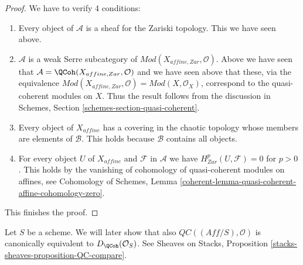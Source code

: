 \begin{proof}
\medskip\noindent
We have to verify 4 conditions:
\begin{enumerate}
\item Every object of $\mathcal{A}$ is a sheaf for the Zariski topology.
This we have seen above.
\item $\mathcal{A}$ is a weak Serre subcategory of
$\textit{Mod}(X_{affine, Zar}, \mathcal{O})$. Above we have
seen that $\mathcal{A} = \QCoh(X_{affine, Zar}, \mathcal{O})$ and
we have seen above that these,
via the equivalence $\textit{Mod}(X_{affine, Zar}, \mathcal{O}) =
\textit{Mod}(X, \mathcal{O}_X)$, correspond to the quasi-coherent modules
on $X$. Thus the result follows from the discussion in
Schemes, Section \ref{schemes-section-quasi-coherent}.
\item Every object of $X_{affine}$ has a covering in the chaotic
topology whose members are elements of $\mathcal{B}$. This holds
because $\mathcal{B}$ contains all objects.
\item For every object $U$ of $X_{affine}$ and $\mathcal{F}$ in $\mathcal{A}$
we have $H^p_{Zar}(U, \mathcal{F}) = 0$ for $p > 0$.
This holds by the vanishing of cohomology of quasi-coherent modules
on affines, see
Cohomology of Schemes, Lemma
\ref{coherent-lemma-quasi-coherent-affine-cohomology-zero}.
\end{enumerate}
This finishes the proof.
\end{proof}

\begin{remark}
\label{remark-QC-compare}
Let $S$ be a scheme. We will later show that also
$\mathit{QC}((\textit{Aff}/S), \mathcal{O})$
is canonically equivalent to $D_\QCoh(\mathcal{O}_S)$.
See Sheaves on Stacks, Proposition \ref{stacks-sheaves-proposition-QC-compare}.
\end{remark}















